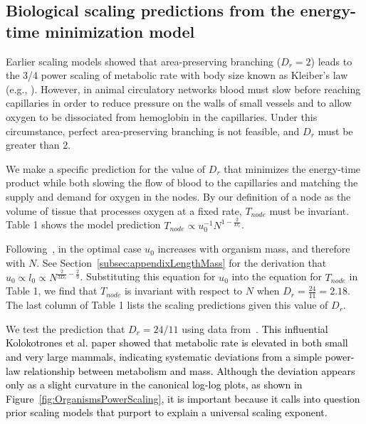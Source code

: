 \documentclass[12pt]{article}
\newcommand{\red}[1]{\textcolor{black}{#1}}
\begin{document}
\newpage
\subsection{Biological scaling predictions from the energy-time minimization model}
\label{sec:bio-predictions}

Earlier scaling models showed that area-preserving
branching ($D_r = 2$) leads to the 3/4 power scaling of metabolic rate with body
size known as Kleiber's law (e.g., \cite{west97, banavar10}).
However, in animal circulatory networks blood must slow before reaching capillaries in order to
reduce pressure on the walls of small vessels and to allow oxygen to be
dissociated from hemoglobin in the capillaries.   Under this circumstance,
perfect area-preserving branching is not feasible, and $D_r$ must be greater than 2.

We make a specific prediction for the value of $D_r$ that minimizes the energy-time product while both slowing the flow of blood to the capillaries and matching the supply and demand for oxygen in the nodes. By our definition of a node as the volume of tissue that processes oxygen at a fixed rate, $T_{node}$ must be invariant. Table 1 shows the model prediction $T_{node} \propto u_0^{-1}N^{1-\frac{2}{D_r}}$.

Following~\cite{banavar10}, in the optimal case $u_0$ increases with organism mass, and therefore with $N$. See Section~\ref{subsec:appendixLengthMass} for the derivation that $u_0 \propto l_0 \propto N^{\frac{2}{3D_r} - \frac{2}{9}}$. Substituting this equation for $u_0$ into the equation for $T_{node}$ in Table 1, we find that $T_{node}$ is invariant with respect to $N$ when $D_r = \frac{24}{11} = 2.18$. The last column of Table 1 lists the scaling predictions given this value of $D_r$. 

We test the prediction that $D_r = 24/11$ using data from~\cite{kolokotrones2010curvature}.
\red{This influential Kolokotrones et al. paper showed that metabolic rate is elevated in both small and very large mammals, indicating systematic
deviations from a simple power-law relationship between metabolism and
mass.  Although the deviation appears only as a slight curvature in the canonical log-log
plots, as shown in Figure~\ref{fig:OrganismsPowerScaling}, it is important because it calls into question prior scaling models that purport to explain a universal scaling exponent.}
\end{document}
